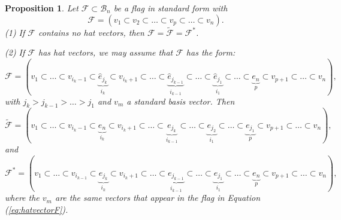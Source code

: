 \documentclass[12pt]{amsart}
\numberwithin{equation}{section}
\newtheorem{prop}[thm]{Proposition}
\newcommand{\B}{\mathcal{B}}
\newcommand{\he}{\hat{e}}
\newcommand{\F}{\mathcal{F}}
\begin{document}
\begin{prop}\label{p:orbits}
Let $\F\subset \B_{n}$ be a flag in standard form with 
$$
\F=(v_{1}\subset v_{2}\subset \dots\subset v_{p}\subset \dots\subset v_{n}).
$$  
(1) If $\F$ contains no hat vectors, then 
$\F=\tilde{\F}=\F^{*}$. 

\noindent (2) If $\F$ has hat vectors, we may assume that $\F$ has the form:
\begin{equation}\label{eq:hatvectorF}
\F=(v_{1}\subset\dots\subset v_{i_{k}-1}\subset\underbrace{ \he_{j_{k}}}_{i_{k}}\subset v_{i_{k}+1}\subset \dots \subset \underbrace{\he_{j_{k-1}}}_{i_{k-1}}\subset \dots \subset \underbrace{\he_{j_{1}}}_{i_{1}}\subset \dots\subset \underbrace{e_{n}}_{p}\subset v_{p+1}\subset \dots\subset v_{n}),
\end{equation}
with $j_{k}>j_{k-1}>\dots>j_{1}$ and $v_{m}$ a standard basis vector.  
Then
\begin{equation}\label{eq:tildeF}
\tilde{\F}=(v_{1}\subset\dots\subset v_{i_{k}-1}\subset\underbrace{e_{n}}_{i_{k}}\subset v_{i_{k}+1}\subset \dots\subset \underbrace{e_{j_{k}}}_{i_{k-1}}\subset\dots\subset \underbrace{e_{j_{2}}}_{i_{1}}\subset \dots\subset\underbrace{e_{j_{1}}}_{p}\subset v_{p+1}\subset\dots\subset v_{n}),
\end{equation}
and 
\begin{equation}\label{eq:starF}
\F^{*}=(v_{1}\subset \dots\subset v_{i_{k-1}}\subset \underbrace{e_{j_{k}}}_{i_{k}}\subset v_{i_{k}+1}\subset \dots\subset \underbrace{e_{j_{k-1}}}_{i_{k-1}}\subset \dots\subset \underbrace{e_{j_{1}}}_{i_{1}}\subset \dots\subset\underbrace{e_{n}}_{p}\subset v_{p+1}\subset \dots\subset v_{n}),
\end{equation}
where the $v_{m}$ are the same vectors that appear in the flag in Equation (\ref{eq:hatvectorF}).

\end{prop}
\end{document}
